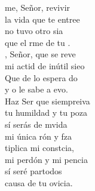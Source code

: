 \begin{cancion}[de][Olivo]%
	me, Señor, revivir \\
	la vida que te entree\\
	 no tuvo otro sia \\
	que el rme de tu .\\
	, Señor, que se reve \\
	mi actid de inútil sieo\\
	Que de lo espera do \\
	y o le sabe a evo.   \\
	\jump
	Haz Ser que siempreiva \\
	tu humildad y tu poza\\
	sí serás de mvida \\
	mi única rón y fza\\
	tiplica mi constcia,\\
	mi perdón y mi pencia\\
	sí seré partodos \\
	causa de tu ovicia.\\
\end{cancion}%
